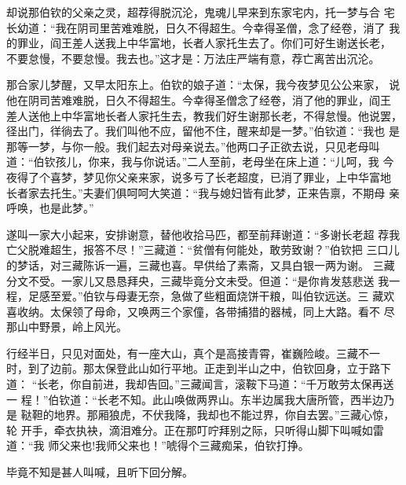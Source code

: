 却说那伯钦的父亲之灵，超荐得脱沉沦，鬼魂儿早来到东家宅内，托一梦与合
宅长幼道：“我在阴司里苦难难脱，日久不得超生。今幸得圣僧，念了经卷，消了
我的罪业，阎王差人送我上中华富地，长者人家托生去了。你们可好生谢送长老，
不要怠慢，不要怠慢。我去也。”这才是：万法庄严端有意，荐亡离苦出沉沦。

那合家儿梦醒，又早太阳东上。伯钦的娘子道：“太保，我今夜梦见公公来家，
说他在阴司苦难难脱，日久不得超生。今幸得圣僧念了经卷，消了他的罪业，阎王
差人送他上中华富地长者人家托生去，教我们好生谢那长老，不得怠慢。他说罢，
径出门，徉徜去了。我们叫他不应，留他不住，醒来却是一梦。”伯钦道：“我也
是那等一梦，与你一般。我们起去对母亲说去。”他两口子正欲去说，只见老母叫
道：“伯钦孩儿，你来，我与你说话。”二人至前，老母坐在床上道：“儿呵，我
今夜得了个喜梦，梦见你父亲来家，说多亏了长老超度，已消了罪业，上中华富地
长者家去托生。”夫妻们俱呵呵大笑道：“我与媳妇皆有此梦，正来告禀，不期母
亲呼唤，也是此梦。”

遂叫一家大小起来，安排谢意，替他收拾马匹，都至前拜谢道：“多谢长老超
荐我亡父脱难超生，报答不尽！”三藏道：“贫僧有何能处，敢劳致谢？”伯钦把
三口儿的梦话，对三藏陈诉一遍，三藏也喜。早供给了素斋，又具白银一两为谢。
三藏分文不受。一家儿又恳恳拜央，三藏毕竟分文未受。但道：“是你肯发慈悲送
我一程，足感至爱。”伯钦与母妻无奈，急做了些粗面烧饼干粮，叫伯钦远送。三
藏欢喜收纳。太保领了母命，又唤两三个家僮，各带捕猎的器械，同上大路。看不
尽那山中野景，岭上风光。

行经半日，只见对面处，有一座大山，真个是高接青霄，崔巍险峻。三藏不一
时，到了边前。那太保登此山如行平地。正走到半山之中，伯钦回身，立于路下道：
“长老，你自前进，我却告回。”三藏闻言，滚鞍下马道：“千万敢劳太保再送一
程！”伯钦道：“长老不知。此山唤做两界山。东半边属我大唐所管，西半边乃是
鞑靼的地界。那厢狼虎，不伏我降，我却也不能过界，你自去罢。”三藏心惊，轮
开手，牵衣执袂，滴泪难分。正在那叮咛拜别之际，只听得山脚下叫喊如雷道：“我
师父来也!我师父来也！”唬得个三藏痴呆，伯钦打挣。

毕竟不知是甚人叫喊，且听下回分解。